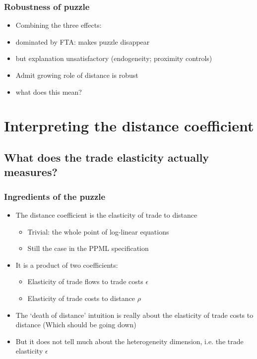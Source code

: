 \documentclass{beamer}
\begin{document}
\begin{frame}[plain]\frametitle{Robustness of puzzle}
\vspace{0.3cm}
\begin{itemize}
\item Combining the three effects:
\item dominated by FTA: makes puzzle disappear
\item but explanation unsatisfactory (endogeneity; proximity controls)
\vspace{.3cm}
\item Admit growing role of distance is robust
\item what does this mean?
\end{itemize}
\end{frame}
\fi

\section{Interpreting the distance coefficient}
\subsection{What does the trade elasticity actually measures?}
\begin{frame}\frametitle{Ingredients of the puzzle}
\begin{itemize}
\vspace{0.3cm}
\item The distance coefficient is the elasticity of trade to distance
\begin{itemize}
\item Trivial: the whole point of log-linear equations
\item Still the case in the PPML specification
\end{itemize}
\vspace{0.3cm}
\item It is a product of two coefficients:
\begin{itemize}
\item Elasticity of trade flows to trade costs $\epsilon$
\item Elasticity of trade costs to distance $\rho$
\end{itemize}
\vspace{0.3cm}
\item The `death of distance' intuition is really about the elasticity of trade costs to distance (Which should be going down)
\item But it does not tell much about the heterogeneity dimension, i.e. the trade elasticity $\epsilon$
\end{itemize}
\end{frame}
\end{document}
